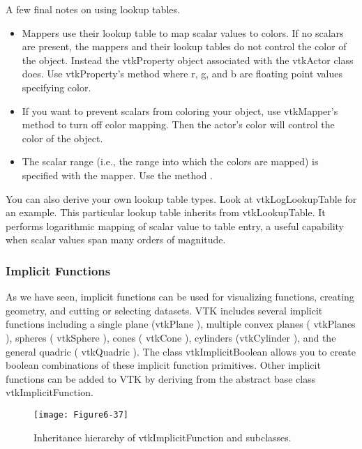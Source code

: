 A few final notes on using lookup tables.

\begin{itemize}

\item  Mappers use their lookup table to map scalar values to colors. If no scalars are present, the mappers and their lookup tables do not control the color of the object. Instead the vtkProperty object associated with the vtkActor class does. Use vtkProperty's method  where r, g, and b are floating point values specifying color.

\item If you want to prevent scalars from coloring your object, use vtkMapper's method  to turn off color mapping. Then the actor's color will control the color of the object.

\item The scalar range (i.e., the range into which the colors are mapped) is specified with the mapper. Use the method .

\end{itemize}

You can also derive your own lookup table types. Look at vtkLogLookupTable for an example. This particular lookup table inherits from vtkLookupTable. It performs logarithmic mapping of scalar value to table entry, a useful capability when scalar values span many orders of magnitude.

\subsubsection{Implicit Functions}

As we have seen, implicit functions can be used for visualizing functions, creating geometry, and cutting or selecting datasets. VTK includes several implicit functions including a single plane (vtkPlane ), multiple convex planes ( vtkPlanes ), spheres ( vtkSphere ), cones ( vtkCone ), cylinders (vtkCylinder ), and the general quadric ( vtkQuadric ). The class vtkImplicitBoolean allows you to create boolean combinations of these implicit function primitives. Other implicit functions can be added to VTK by deriving from the abstract base class vtkImplicitFunction.

\begin{figure}[htb]
	\texttt{[image: Figure6-37]}
	\caption{Inheritance hierarchy of vtkImplicitFunction and subclasses.}\label{fig:Figure6-37}
\end{figure}

